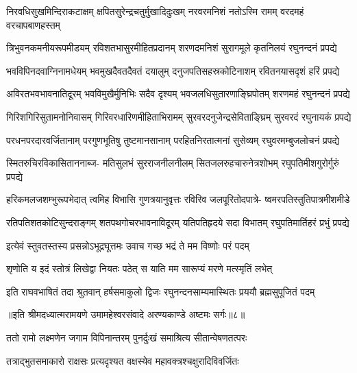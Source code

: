\fourlineindentedshloka
{निरवधिसुखमिन्दिराकटाक्षम्}
{क्षपितसुरेन्द्रचतुर्मुखादिदुःखम्}
{नरवरमनिशं नतोऽस्मि रामम्}
{वरदमहं वरचापबाणहस्तम्} %

\fourlineindentedshloka
{त्रिभुवनकमनीयरूपमीड्यम्}
{रविशतभासुरमीहितप्रदानम्}
{शरणदमनिशं सुरागमूले}
{कृतनिलयं रघुनन्दनं प्रपद्ये} %

\fourlineindentedshloka
{भवविपिनदवाग्निनामधेयम्}
{भवमुखदैवतदैवतं दयालुम्}
{दनुजपतिसहस्रकोटिनाशम्}
{रवितनयासदृशं हरिं प्रपद्ये} %

\fourlineindentedshloka
{अविरतभवभावनातिदूरम्}
{भवविमुखैर्मुनिभिः सदैव दृश्यम्}
{भवजलधिसुतारणाङ्घ्रिपोतम्}
{शरणमहं रघुनन्दनं प्रपद्ये} %

\fourlineindentedshloka
{गिरिशगिरिसुतामनोनिवासम्}
{गिरिवरधारिणमीहिताभिरामम्}
{सुरवरदनुजेन्द्रसेविताङ्घ्रिम्}
{सुरवरदं रघुनायकं प्रपद्ये} %

\fourlineindentedshloka
{परधनपरदारवर्जितानाम्}
{परगुणभूतिषु तुष्टमानसानाम्}
{परहितनिरतात्मनां सुसेव्यम्}
{रघुवरमम्बुजलोचनं प्रपद्ये} %

\fourlineindentedshloka
{स्मितरुचिरविकासिताननाब्ज-}
{मतिसुलभं सुरराजनीलनीलम्}
{सितजलरुहचारुनेत्रशोभम्}
{रघुपतिमीशगुरोर्गुरुं प्रपद्ये} %

\fourlineindentedshloka
{हरिकमलजशम्भुरूपभेदात्}
{त्वमिह विभासि गुणत्रयानुवृत्तः}
{रविरिव जलपूरितोदपात्रे-}
{ष्वमरपतिस्तुतिपात्रमीशमीडे} %

\fourlineindentedshloka
{रतिपतिशतकोटिसुन्दराङ्गम्}
{शतपथगोचरभावनाविदूरम्}
{यतिपतिहृदये सदा विभातम्}
{रघुपतिमार्तिहरं प्रभुं प्रपद्ये} %

\twolineshloka
{इत्येवं स्तुवतस्तस्य प्रसन्नोऽभूद्रघूत्तमः}
{उवाच गच्छ भद्रं ते मम विष्णोः परं पदम्} %

\twolineshloka
{शृणोति य इदं स्तोत्रं लिखेद्वा नियतः पठेत्}
{स याति मम सारूप्यं मरणे मत्स्मृतिं लभेत्} %

\fourlineindentedshloka
{इति राघवभाषितं तदा}
{श्रुतवान् हर्षसमाकुलो द्विजः}
{रघुनन्दनसाम्यमास्थितः}
{प्रययौ ब्रह्मसुपूजितं पदम्} %

{॥इति श्रीमदध्यात्मरामयणे उमामहेश्वरसंवादे
अरण्यकाण्डे अष्टमः सर्गः॥८॥
}





\twolineshloka
{ततो रामो लक्ष्मणेन जगाम विपिनान्तरम्}
{पुनर्दुःखं समाश्रित्य सीतान्वेषणतत्परः} %

\twolineshloka
{तत्राद्भुतसमाकारो राक्षसः प्रत्यदृश्यत}
{वक्षस्येव महावक्त्रश्चक्षुरादिविवर्जितः} %

